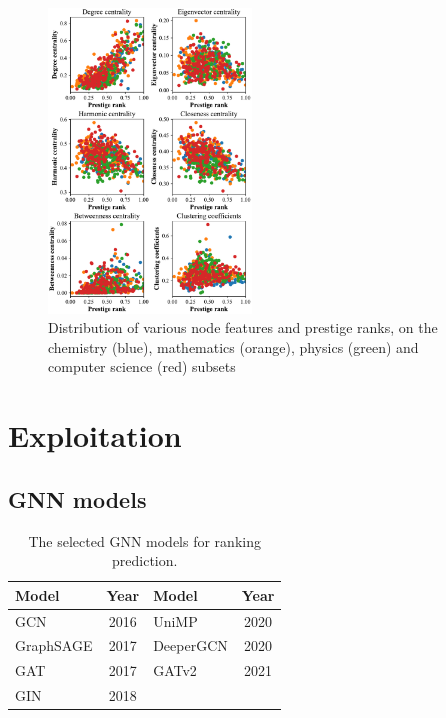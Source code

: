 \documentclass[journal]{IEEEtran}
\begin{document}
\begin{figure}[htbp]
\centerline{\includegraphics[width=0.48\textwidth]{figures/fig2.pdf}}
\caption{Distribution of various node features and prestige ranks, on the chemistry (blue), mathematics (orange), physics (green) and computer science (red) subsets}
\label{fig2}
\end{figure}


\section{Exploitation}


\subsection{GNN models}

\begin{table}[htbp]
\caption{The selected GNN models for ranking prediction.}
\begin{center}
\begin{tabular}{lc | lc }
\hline
\textbf{Model} & \textbf{Year} & \textbf{Model} & \textbf{Year}  \\
\hline
GCN  &  2016  &  UniMP  &  2020   \\
GraphSAGE  &  2017 & DeeperGCN  &  2020    \\
GAT  & 2017  & GATv2  &  2021     \\
GIN  & 2018  &   &     \\
\hline
\end{tabular}
\label{t2}
\end{center}
\end{table}
\end{document}
